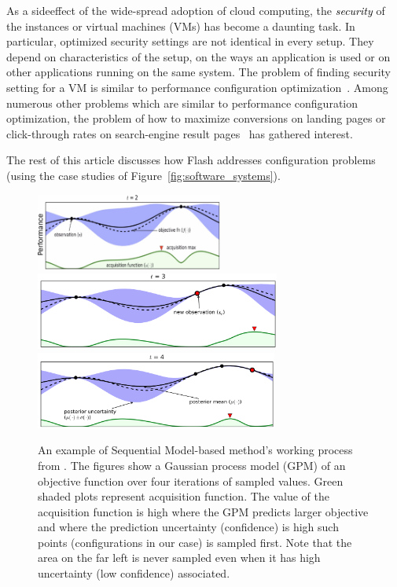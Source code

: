 \documentclass[10pt,journal,compsoc]{IEEEtran}
\newcommand{\fig}[1]{Figure~\ref{fig:#1}}
\newcommand{\flash}{{\sc Flash}\xspace}
\begin{document}
As a sideeffect of the wide-spread adoption of cloud computing, the \textcolor{black}{{\em security}} of the instances or virtual machines (VMs) has become a daunting task. In particular, optimized security settings are not identical in every setup. They depend on characteristics of the setup, on the ways an application is used or on other applications running on the same system. The problem of finding security setting for a VM is similar to performance configuration optimization~\cite{biedermann2014hot, biedermann2014leveraging, drabik2003method, security1, security2}. 
Among numerous other problems which are similar to performance configuration optimization, the problem of how to maximize conversions on landing pages or click-through rates on search-engine result pages~\cite{hill2017efficient, wang2016beyond, zhu2017optimized} has gathered interest.  


The rest of this article discusses how \flash addresses configuration problems (using
the case studies of \fig{software_systems}). 

\begin{figure}[!htb]
      \includegraphics[width=\linewidth, height=1in]{Figures/bayesian_1.png}
    \endminipage\hfill
      \includegraphics[width=\linewidth, height=1in]{Figures/bayesian_2.png}
    \endminipage\hfill
      \includegraphics[width=\linewidth, height=1in]{Figures/bayesian_3.png}
    \endminipage
\caption{An example of Sequential Model-based method's working process from \cite{brochu2010tutorial}. The figures show a Gaussian process model (GPM) of an objective function over
four iterations of sampled values.
Green shaded plots represent acquisition function. The value of the acquisition function is high where the GPM predicts larger objective and where the prediction uncertainty (confidence) is high such points (configurations in our case) is sampled first. Note that the area on the far left is never sampled even when it has high uncertainty (low confidence) associated.} 
\label{fig:bayesian_optimazation}
\end{figure}
\end{document}
